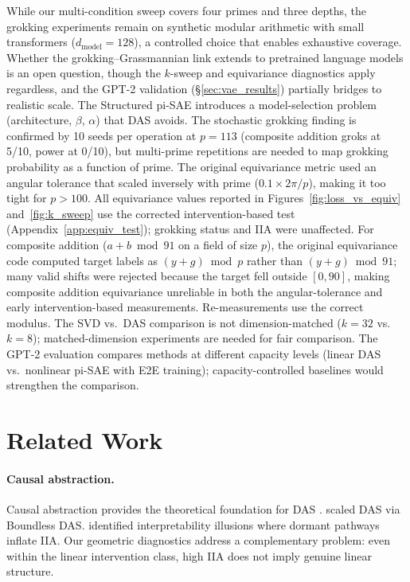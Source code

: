 \documentclass{article}
\begin{document}
While our multi-condition sweep covers four primes and three depths, the
grokking experiments remain on synthetic modular arithmetic with small
transformers ($d_\text{model} = 128$), a controlled choice that enables
exhaustive coverage. Whether the grokking--Grassmannian link extends to
pretrained language models is an open question, though the $k$-sweep and
equivariance diagnostics apply regardless, and the GPT-2 validation
(\S\ref{sec:vae_results}) partially bridges to realistic scale. The Structured
pi-SAE introduces a model-selection problem (architecture, $\beta$, $\alpha$)
that DAS avoids. The stochastic grokking finding is confirmed by 10 seeds per operation
at $p{=}113$ (composite addition groks at 5/10, power at 0/10), but
multi-prime repetitions are needed to map grokking probability as a function
of prime. The original equivariance metric used an angular
tolerance that scaled inversely with prime ($0.1 \times 2\pi/p$), making it
too tight for $p > 100$. All equivariance values reported in Figures~\ref{fig:loss_vs_equiv}
and~\ref{fig:k_sweep} use the corrected intervention-based test
(Appendix~\ref{app:equiv_test}); grokking status and IIA were unaffected.
For composite addition ($a + b \bmod 91$ on a field of size $p$), the
original equivariance code computed target labels as
$(y + g) \bmod p$ rather than $(y + g) \bmod 91$; many valid shifts were
rejected because the target fell outside $[0, 90]$, making composite
addition equivariance unreliable in both the angular-tolerance and early
intervention-based measurements. Re-measurements use the correct modulus. The SVD vs.\ DAS comparison is not
dimension-matched ($k = 32$ vs.\ $k = 8$); matched-dimension experiments
are needed for fair comparison. The GPT-2 evaluation compares methods at
different capacity levels (linear DAS vs.\ nonlinear pi-SAE with E2E
training); capacity-controlled baselines would strengthen the comparison.


\section{Related Work}
\label{sec:related}

\paragraph{Causal abstraction.}
Causal abstraction provides the theoretical foundation for DAS
\citep{geiger2021causal, geiger2023finding}. \citet{wu2024interpretability}
scaled DAS via Boundless DAS. \citet{makelov2024illusion} identified
interpretability illusions where dormant pathways inflate IIA. Our geometric
diagnostics address a complementary problem: even within the linear intervention
class, high IIA does not imply genuine linear structure.
\end{document}
